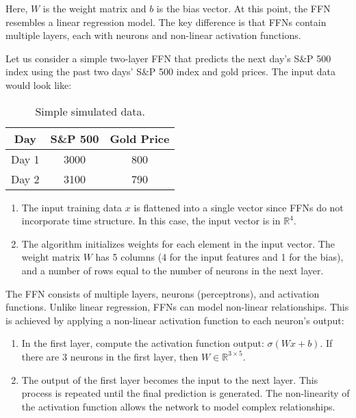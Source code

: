 Here, \( W \) is the weight matrix and \( b \) is the bias vector. At this point, the FFN resembles a linear regression model. The key difference is that FFNs contain multiple layers, each with neurons and non-linear activation functions.

Let us consider a simple two-layer FFN that predicts the next day's S\&P 500 index using the past two days' S\&P 500 index and gold prices. The input data would look like:

\begin{table}[htbp]
    \centering
    \begin{tabular}{c|c|c}
        \textbf{Day} & \textbf{S\&P 500} & \textbf{Gold Price} \\
        \hline
        Day 1 & 3000 & 800 \\
        Day 2 & 3100 & 790
    \end{tabular}
    \caption{Simple simulated data.}
    \label{tab:SPandGOLD}
\end{table}

\begin{enumerate}
    \item The input training data \( x \) is flattened into a single vector since FFNs do not incorporate time structure. In this case, the input vector is in \( \mathbb{R}^{4} \).
    \item The algorithm initializes weights for each element in the input vector. The weight matrix \( W \) has 5 columns (4 for the input features and 1 for the bias), and a number of rows equal to the number of neurons in the next layer.
\end{enumerate}

The FFN consists of multiple layers, neurons (perceptrons), and activation functions. Unlike linear regression, FFNs can model non-linear relationships. This is achieved by applying a non-linear activation function to each neuron's output:

\begin{enumerate}
    \item In the first layer, compute the activation function output: \( \sigma(Wx + b) \). If there are 3 neurons in the first layer, then \( W \in \mathbb{R}^{3 \times 5} \).
    \item The output of the first layer becomes the input to the next layer. This process is repeated until the final prediction is generated. The non-linearity of the activation function allows the network to model complex relationships.
\end{enumerate}
